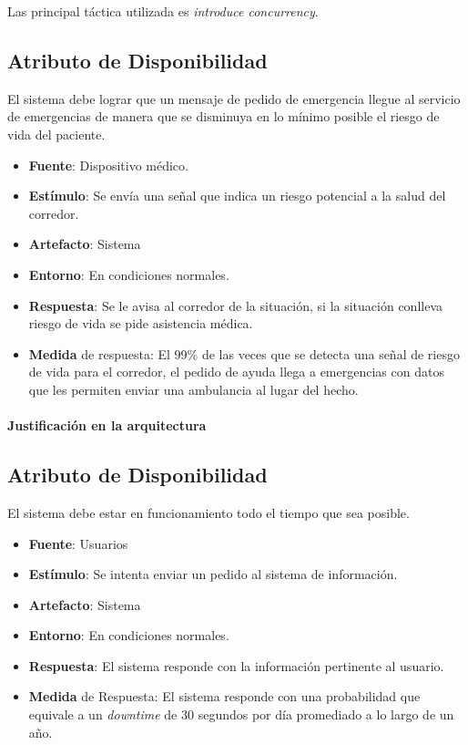 Las principal táctica utilizada es \emph{introduce concurrency}. 


\subsection{Atributo de Disponibilidad}
El sistema debe lograr que un mensaje de pedido de emergencia llegue al servicio de emergencias de manera que se disminuya en lo mínimo posible el riesgo de vida del paciente.

\begin{itemize}
  \item \textbf{Fuente}: Dispositivo médico.
  \item \textbf{Estímulo}: Se envía una señal que indica un riesgo potencial a la salud del corredor.
  \item \textbf{Artefacto}: Sistema
  \item \textbf{Entorno}: En condiciones normales.
  \item \textbf{Respuesta}: Se le avisa al corredor de la situación, si la situación conlleva riesgo de vida se pide asistencia médica.
  \item \textbf{Medida} de respuesta: El 99\% de las veces que se detecta una señal de riesgo de vida para el corredor, el pedido de ayuda llega a emergencias con datos que les permiten enviar una ambulancia al lugar del hecho.
\end{itemize}

\paragraph{Justificación en la arquitectura}


\subsection{Atributo de Disponibilidad}
El sistema debe estar en funcionamiento todo el tiempo que sea posible.

\begin{itemize}
  \item \textbf{Fuente}: Usuarios
  \item \textbf{Estímulo}: Se intenta enviar un pedido al sistema de información.
  \item \textbf{Artefacto}: Sistema
  \item \textbf{Entorno}: En condiciones normales.
  \item \textbf{Respuesta}: El sistema responde con la información pertinente al usuario.
  \item \textbf{Medida} de Respuesta: El sistema responde con una probabilidad que equivale a un \emph{downtime} de 30 segundos por día promediado a lo largo de un año.
\end{itemize}

